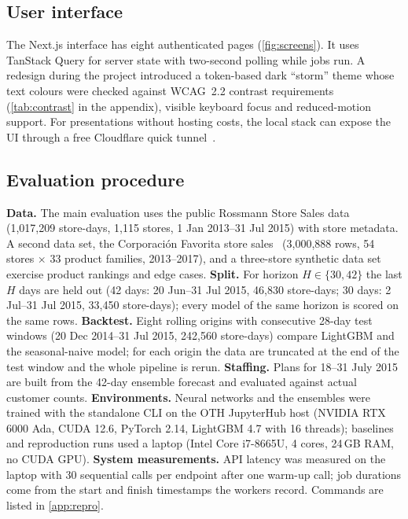 \documentclass[conference]{IEEEtran}
\begin{document}
\subsection{User interface}
The Next.js interface has eight authenticated pages (\cref{fig:screens}). It uses TanStack Query for
server state with two-second polling while jobs run. A redesign during the project introduced a
token-based dark ``storm'' theme whose text colours were checked against WCAG~2.2 contrast
requirements~\cite{w3c2023wcag22} (\cref{tab:contrast} in the appendix), visible keyboard focus and
reduced-motion support. For presentations without hosting costs, the local stack can expose the UI
through a free Cloudflare quick tunnel~\cite{cloudflaretunnel}.

\subsection{Evaluation procedure}\label{sec:procedure}
\textbf{Data.} The main evaluation uses the public Rossmann Store Sales data~\cite{kaggle2015rossmann}
(1,017,209 store-days, 1,115 stores, 1 Jan 2013--31 Jul 2015) with store metadata. A second data set,
the Corporaci\'on Favorita store sales~\cite{kaggle2021storesales} (3,000,888 rows, 54 stores $\times$
33 product families, 2013--2017), and a three-store synthetic data set exercise product rankings and
edge cases. \textbf{Split.} For horizon $H\in\{30,42\}$ the last $H$ days are held out
(42 days: 20 Jun--31 Jul 2015, 46,830 store-days; 30 days: 2 Jul--31 Jul 2015, 33,450 store-days);
every model of the same horizon is scored on the same rows. \textbf{Backtest.} Eight rolling
origins with consecutive 28-day test windows (20 Dec 2014--31 Jul 2015, 242,560 store-days) compare
LightGBM and the seasonal-naive model; for each origin the data are truncated at the end of the test
window and the whole pipeline is rerun. \textbf{Staffing.} Plans for 18--31 July 2015 are built from the
42-day ensemble forecast and evaluated against actual customer counts. \textbf{Environments.} Neural networks
and the ensembles were trained with the standalone CLI on the OTH JupyterHub host (NVIDIA RTX 6000
Ada, CUDA 12.6, PyTorch 2.14, LightGBM 4.7 with 16 threads); baselines and reproduction runs used a
laptop (Intel Core i7-8665U, 4 cores, 24\,GB RAM, no CUDA GPU). \textbf{System measurements.} API
latency was measured on the laptop with 30 sequential calls per endpoint after one warm-up call;
job durations come from the start and finish timestamps the workers record. Commands are listed in
\cref{app:repro}.
\end{document}
